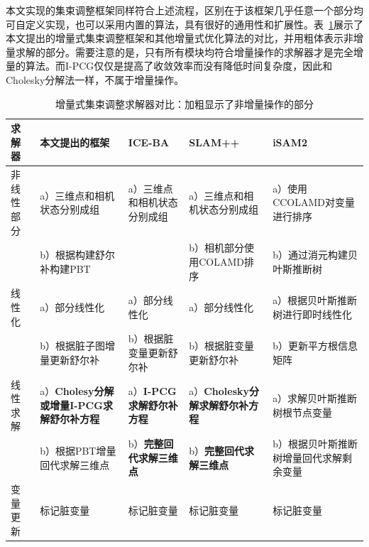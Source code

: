 本文实现的集束调整框架同样符合上述流程，区别在于该框架几乎任意一个部分均可自定义实现，也可以采用内置的算法，具有很好的通用性和扩展性。表~\ref{tab:comp}展示了本文提出的增量式集束调整框架和其他增量式优化算法的对比，并用粗体表示非增量求解的部分。需要注意的是，只有所有模块均符合增量操作的求解器才是完全增量的算法。而I-PCG仅仅是提高了收敛效率而没有降低时间复杂度，因此和Cholesky分解法一样，不属于增量操作。

{
\linespread{1}
\begin{table}[H]
\caption{增量式集束调整求解器对比：加粗显示了非增量操作的部分}
\label{tab:comp}
\centering
\begin{tabular}{l|p{} p{} p{} p{}}
    \toprule
    求解器     & 本文提出的框架
               & ICE-BA
               & SLAM++
               & iSAM2
               \\ \midrule
    非线性部分 & a）三维点和相机状态分别成组
               & a）三维点和相机状态分别成组
               & a）三维点和相机状态分别成组
               & a）使用CCOLAMD对变量进行排序
               \\
               & b）根据构建舒尔补构建PBT
               &
               & b）相机部分使用COLAMD排序
               & b）通过消元构建贝叶斯推断树
               \\ \midrule
    线性化     & a）部分线性化
               & a）部分线性化
               & a）部分线性化
               & a）根据贝叶斯推断树进行即时线性化
               \\
               & b）根据脏子图增量更新舒尔补
               & b）根据脏变量更新舒尔补
               & b）根据脏变量更新舒尔补
               & b）更新平方根信息矩阵
               \\ \midrule
    线性求解   & a）\textbf{Cholesy分解或增量I-PCG求解舒尔补方程}
               & a）\textbf{I-PCG求解舒尔补方程}
               & a）\textbf{Cholesky分解求解舒尔补方程}
               & a）求解贝叶斯推断树根节点变量
               \\
               & b）根据PBT增量回代求解三维点
               & b）\textbf{完整回代求解三维点}
               & b）\textbf{完整回代求解三维点}
               & b）根据贝叶斯推断树增量回代求解剩余变量
               \\ \midrule
    变量更新   & 标记脏变量
               & 标记脏变量
               & 标记脏变量
               & 标记脏变量
               \\
    \bottomrule
\end{tabular}
\end{table}
}


